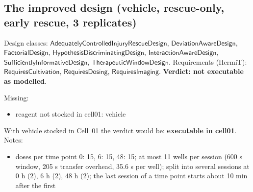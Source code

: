 \documentclass[10pt,a4paper]{article}
\begin{document}
\subsection*{The improved design (vehicle, rescue-only, early rescue, 3 replicates)}
Design classes: $\mathsf{AdequatelyControlledInjuryRescueDesign}$, $\mathsf{DeviationAwareDesign}$, $\mathsf{FactorialDesign}$, $\mathsf{HypothesisDiscriminatingDesign}$, $\mathsf{InteractionAwareDesign}$, $\mathsf{SufficientlyInformativeDesign}$, $\mathsf{TherapeuticWindowDesign}$. Requirements (HermiT): $\mathsf{RequiresCultivation}$, $\mathsf{RequiresDosing}$, $\mathsf{RequiresImaging}$. \textbf{Verdict: \textcolor{red!65!black}{not executable as modelled}}.
\par{}
Missing:\begin{itemize}[nosep]\item reagent not stocked in cell01: vehicle\end{itemize}
With vehicle stocked in Cell~01 the verdict would be: \textbf{executable in cell01}.
Notes:\begin{itemize}[nosep]\item doses per time point {0: 15, 6: 15, 48: 15}; at most 11 wells per session (600 s window, 205 s transfer overhead, 35.6 s per well); split into several sessions at 0 h (2), 6 h (2), 48 h (2); the last session of a time point starts about 10 min after the first\end{itemize}
\end{document}
